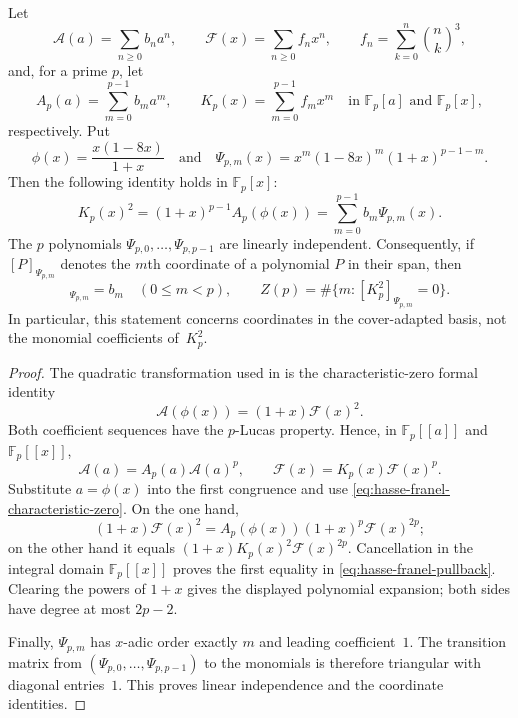\begin{proposition}
\label{prop:hasse-franel-pullback}
Let
\[
 \mathcal A(a)=\sum_{n\geq0}b_na^n,
 \qquad
 \mathcal F(x)=\sum_{n\geq0}f_nx^n,
 \qquad
 f_n=\sum_{k=0}^n\binom nk^3,
\]
and, for a prime $p$, let
\[
 A_p(a)=\sum_{m=0}^{p-1}b_ma^m,
 \qquad
 K_p(x)=\sum_{m=0}^{p-1}f_mx^m
 \quad\text{in }\mathbb F_p[a]\text{ and }\mathbb F_p[x],
\]
respectively.  Put
\[
 \phi(x)=\frac{x(1-8x)}{1+x}
 \quad\text{and}\quad
 \Psi_{p,m}(x)=x^m(1-8x)^m(1+x)^{p-1-m}.
\]
Then the following identity holds in $\mathbb F_p[x]$:
\begin{equation}
 \boxed{K_p(x)^2=(1+x)^{p-1}A_p(\phi(x))
       =\sum_{m=0}^{p-1}b_m\Psi_{p,m}(x).}
 \label{eq:hasse-franel-pullback}
\end{equation}
The $p$ polynomials $\Psi_{p,0},\ldots,\Psi_{p,p-1}$ are linearly
independent.  Consequently, if $[P]_{\Psi_{p,m}}$ denotes the $m$th
coordinate of a polynomial $P$ in their span, then
\begin{equation}
 [K_p^2]_{\Psi_{p,m}}=b_m
 \quad(0\leq m<p),
 \qquad
 Z(p)=\#\{m:[K_p^2]_{\Psi_{p,m}}=0\}.
 \label{eq:hasse-franel-coordinates}
\end{equation}
In particular, this statement concerns coordinates in the
cover-adapted basis, not the monomial coefficients of~$K_p^2$.
\end{proposition}

\begin{proof}
The quadratic transformation used in
\cite[Section~2]{CFVZ2026} is the characteristic-zero formal identity
\begin{equation}
 \mathcal A(\phi(x))=(1+x)\mathcal F(x)^2.
 \label{eq:hasse-franel-characteristic-zero}
\end{equation}
Both coefficient sequences have the $p$-Lucas property.  Hence, in
$\mathbb F_p[[a]]$ and $\mathbb F_p[[x]]$,
\[
 \mathcal A(a)=A_p(a)\mathcal A(a)^p,
 \qquad
 \mathcal F(x)=K_p(x)\mathcal F(x)^p.
\]
Substitute $a=\phi(x)$ into the first congruence and use
\eqref{eq:hasse-franel-characteristic-zero}.  On the one hand,
\[
 (1+x)\mathcal F(x)^2
 =A_p(\phi(x))(1+x)^p\mathcal F(x)^{2p};
\]
on the other hand it equals
$(1+x)K_p(x)^2\mathcal F(x)^{2p}$.  Cancellation in the integral domain
$\mathbb F_p[[x]]$ proves the first equality in
\eqref{eq:hasse-franel-pullback}.  Clearing the powers of $1+x$ gives the
displayed polynomial expansion; both sides have degree at most $2p-2$.

Finally, $\Psi_{p,m}$ has $x$-adic order exactly $m$ and leading
coefficient~$1$.  The transition matrix from
$(\Psi_{p,0},\ldots,\Psi_{p,p-1})$ to the monomials is therefore triangular
with diagonal entries~$1$.  This proves linear independence and the
coordinate identities.
\end{proof}

